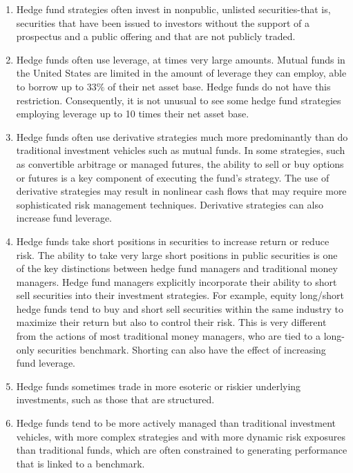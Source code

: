 \documentclass[11pt]{article}
\begin{document}
\begin{enumerate}
  \item Hedge fund strategies often invest in nonpublic, unlisted securities-that is, securities that have been issued to investors without the support of a prospectus and a public offering and that are not publicly traded.

  \item Hedge funds often use leverage, at times very large amounts. Mutual funds in the United States are limited in the amount of leverage they can employ, able to borrow up to $33 \%$ of their net asset base. Hedge funds do not have this restriction. Consequently, it is not unusual to see some hedge fund strategies employing leverage up to 10 times their net asset base.

  \item Hedge funds often use derivative strategies much more predominantly than do traditional investment vehicles such as mutual funds. In some strategies, such as convertible arbitrage or managed futures, the ability to sell or buy options or futures is a key component of executing the fund's strategy. The use of derivative strategies may result in nonlinear cash flows that may require more sophisticated risk management techniques. Derivative strategies can also increase fund leverage.

  \item Hedge funds take short positions in securities to increase return or reduce risk. The ability to take very large short positions in public securities is one of the key distinctions between hedge fund managers and traditional money managers. Hedge fund managers explicitly incorporate their ability to short sell securities into their investment strategies. For example, equity long/short hedge funds tend to buy and short sell securities within the same industry to maximize their return but also to control their risk. This is very different from the actions of most traditional money managers, who are tied to a long-only securities benchmark. Shorting can also have the effect of increasing fund leverage.

  \item Hedge funds sometimes trade in more esoteric or riskier underlying investments, such as those that are structured.

  \item Hedge funds tend to be more actively managed than traditional investment vehicles, with more complex strategies and with more dynamic risk exposures than traditional funds, which are often constrained to generating performance that is linked to a benchmark.

\end{enumerate}
\end{document}

